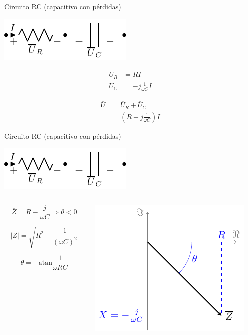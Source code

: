 \documentclass[aspectratio=169, usenames,svgnames,dvipsnames]{beamer}
\newcommand{\atan}{\mathrm{atan}}
\begin{document}
\begin{frame}[label={sec:orgdc5adae}]{Circuito RC (capacitivo con pérdidas)}
\begin{center}
\includegraphics[height=0.2\textheight]{../figs/RC.pdf}
\end{center}

\begin{align*}
  \overline{U}_R &= R \overline{I}\\
  \overline{U}_C &= -j \frac{1}{\omega C} \overline{I}
\end{align*}

\begin{align*}
  \overline{U} &= \overline{U}_R + \overline{U}_C =\\
               &= (R - j \frac{1}{\omega C}) \overline{I} 
\end{align*}
\end{frame}
\begin{frame}[label={sec:orge9a0c29}]{Circuito RC (capacitivo con pérdidas)}
\begin{center}
\includegraphics[height=0.2\textheight]{../figs/RC.pdf}
\end{center}

\begin{columns}
\begin{column}{0.45\columnwidth}
\[
\overline{Z} = R - \frac{j}{\omega C} \Rightarrow \boxed{\theta < 0}
\]

\[
  |Z| = \sqrt{R^2 + \frac{1}{(\omega C)^2}}
\]

\[
  \theta = - \atan{\frac{1}{\omega R C}}
\]
\end{column}

\begin{column}{0.55\columnwidth}
\begin{center}
\includegraphics[height=0.45\textheight]{../figs/fasorCondensadorReal.pdf}
\end{center}
\end{column}
\end{columns}
\end{frame}
\end{document}
